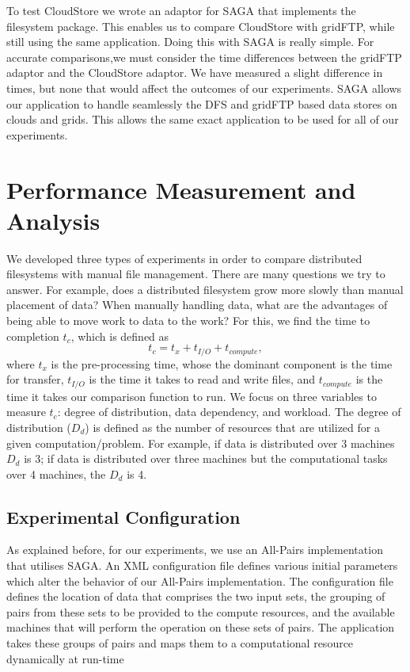 \documentclass{rspublic}
\begin{document}
To test CloudStore we wrote an adaptor for SAGA that implements the
filesystem package. This enables us to compare CloudStore with
gridFTP, while still using the same application. Doing this with SAGA
is really simple. For accurate comparisons,we must consider the time
differences between the gridFTP adaptor and the CloudStore adaptor. We
have measured a slight difference in times, but none that would affect
the outcomes of our experiments.  SAGA allows our application to
handle seamlessly the DFS and gridFTP based data stores on clouds and
grids.  This allows the same exact application to be used for all of
our experiments.



\section{Performance Measurement and Analysis} We developed three types
of experiments in order to compare distributed filesystems with manual
file management. There are many questions we try to answer. For
example, does a distributed filesystem grow more slowly than manual
placement of data? When manually handling data, what are the advantages
of being able to move work to data to the work? For this, we find the
time to completion $t_c$, which is defined as
 \begin{equation}
t_c = t_x + t_{I/O} + t_{compute},
\end{equation}
where $t_x$ is the pre-processing time, whose the dominant component is
the time for transfer, $t_{I/O}$ is the time it takes to read and write
files, and $t_{compute}$ is the time it takes our comparison function to
run. We focus on three variables to measure $t_c$: degree of
distribution, data dependency, and workload. The degree of distribution
($D_d$) is defined as the number of resources that are utilized for a
given computation/problem. For example, if data is distributed over 3
machines $D_d$ is 3; if data is distributed over three machines but the
computational tasks over 4 machines, the $D_d$ is 4.

\subsection{Experimental Configuration}

As explained before, for our experiments, we use an All-Pairs
implementation that utilises SAGA. An XML configuration file defines
various initial parameters which alter the behavior of our All-Pairs
implementation. The configuration file defines the location of data that
comprises the two input sets, the grouping of pairs from these sets to
be provided to the compute resources, and the available machines that
will perform the operation on these sets of pairs. The application takes
these groups of pairs and maps them to a computational resource
dynamically at run-time 
\end{document}
